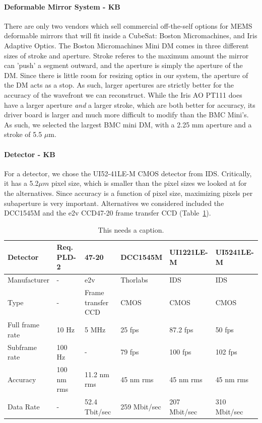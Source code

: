 \documentclass[12pt]{article}
\begin{document}
\paragraph{Deformable Mirror System - KB} \label{par:payload_dms}

There are only two vendors which sell commercial off-the-self options for MEMS deformable mirrors that will fit inside a CubeSat: Boston Micromachines, and Iris Adaptive Optics. The Boston Micromachines Mini DM comes in three different sizes of stroke and aperture. Stroke
referes to the maximum amount the mirror can 'push' a segment outward, and the aperture is simply the aperture of the DM. Since there is little room for resizing optics in our system, the aperture of the DM
acts as a stop. As such, larger apertures are strictly better for the accuracy of the wavefront we can reconstruct. While the Iris AO PT111 does have a larger aperture \emph{and} a larger stroke, which are both
better for accuracy, its driver board is larger and much more difficult to modify than the BMC Mini's. As such, we selected the largest BMC mini DM, with a 2.25 mm aperture and a stroke of 5.5 $\mu \text{m}$.

\paragraph{Detector - KB} \label{par:payload_detector}

For a detector, we chose the UI52-41LE-M CMOS detector from
IDS. Critically, it has a 5.2$\mu m$ pixel size, which is smaller than
the pixel sizes we looked at for the alternatives. Since accuracy is a
function of pixel size, maximizing pixels per subaperture is very
important. Alternatives we considered included the DCC1545M and the
e2v CCD47-20 frame transfer CCD (Table~\ref{table:payload_detectors}). 
\begin{table}[!ht]
  \caption{This needs a caption.}
    \begin{tabular}{|l||l|llll|}
    \hline
    Detector                      & Req. PLD-2
    &47-20&DCC1545M&UI1221LE-M&UI5241LE-M\\ \hline \hline
    Manufacturer&-&e2v&Thorlabs&IDS&IDS\\ \hline
    Type&-&Frame transfer CCD&CMOS&CMOS&CMOS\\ \hline
    Full frame rate&  10 Hz            & 5 MHz                       & 25 fps                 & 87.2 fps            & 50 fps              \\ \hline
    Subframe rate& 100 Hz            & -                           & 79 fps                 & 100 fps             & 102 fps             \\ \hline
    Accuracy       & 100 nm rms        & 11.2 nm rms                 & 45 nm rms              & 45 nm rms           & 45 nm rms           \\ \hline
    Data Rate& -                 & 52.4 Tbit/sec               & 259 Mbit/sec           & 207 Mbit/sec        & 310 Mbit/sec        \\\hline
    \end{tabular}\label{table:payload_detectors}
\end{table}
\end{document}
